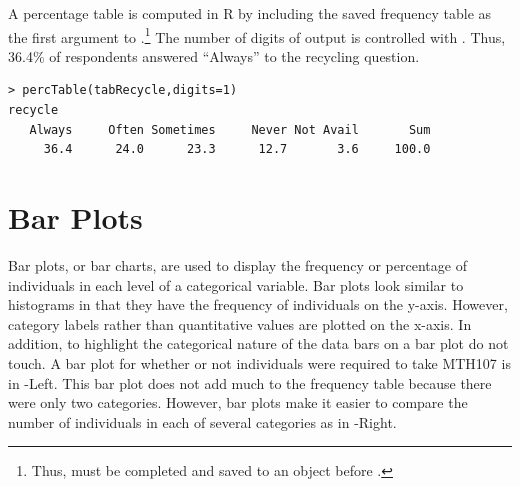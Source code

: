 \documentclass[10pt,openany]{book}\usepackage[]{graphicx}\usepackage[]{color}
\makeatletter
\newenvironment{kframe}{%
 \def\at@end@of@kframe{}%
 \ifinner\ifhmode%
  \def\at@end@of@kframe{\end{minipage}}%
  \begin{minipage}{\columnwidth}%
 \fi\fi%
 \def\FrameCommand##1{\hskip\@totalleftmargin \hskip-\fboxsep
 \colorbox{shadecolor}{##1}\hskip-\fboxsep
     \hskip-\linewidth \hskip-\@totalleftmargin \hskip\columnwidth}%
 \MakeFramed {\advance\hsize-\width
   \@totalleftmargin\z@ \linewidth\hsize
   \@setminipage}}%
 {\par\unskip\endMakeFramed%
 \at@end@of@kframe}
\newenvironment{knitrout}{}{} %
\makeatother
\begin{document}
A percentage table is computed in R by including the saved frequency table as the first argument to .\footnote{Thus,  must be completed and saved to an object before .}  The number of digits of output is controlled with . Thus, 36.4\% of respondents answered ``Always'' to the recycling question.
\begin{knitrout}
\color{fgcolor}\begin{kframe}
\begin{verbatim}
> percTable(tabRecycle,digits=1)
recycle
   Always     Often Sometimes     Never Not Avail       Sum 
     36.4      24.0      23.3      12.7       3.6     100.0 
\end{verbatim}
\end{kframe}
\end{knitrout}

\section{Bar Plots}
Bar plots, or bar charts, are used to display the frequency or percentage of individuals in each level of a categorical variable.  Bar plots look similar to histograms in that they have the frequency of individuals on the y-axis.  However, category labels rather than quantitative values are plotted on the x-axis.  In addition, to highlight the categorical nature of the data bars on a bar plot do not touch.  A bar plot for whether or not individuals were required to take MTH107 is in -Left.  This bar plot does not add much to the frequency table because there were only two categories.  However, bar plots make it easier to compare the number of individuals in each of several categories as in -Right.
\end{document}
